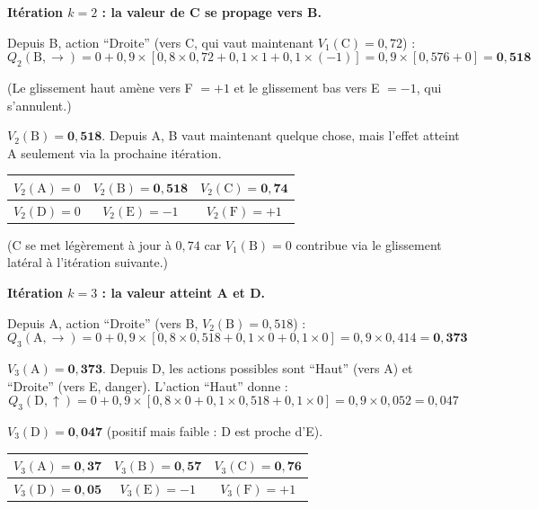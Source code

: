 \documentclass[11pt,a4paper]{article}
\begin{document}
\bigskip
\textbf{Itération $k=2$ : la valeur de C se propage vers B.}

Depuis B, action ``Droite'' (vers C, qui vaut maintenant $V_1(\text{C})=0{,}72$) :
$$Q_2(\text{B}, \rightarrow) = 0 + 0{,}9 \times [0{,}8 \times 0{,}72 + 0{,}1 \times 1 + 0{,}1 \times(-1)] = 0{,}9 \times [0{,}576 + 0] = \mathbf{0{,}518}$$

(Le glissement haut amène vers F $=+1$ et le glissement bas vers E $=-1$, qui s'annulent.)

$V_2(\text{B}) = \mathbf{0{,}518}$. Depuis A, B vaut maintenant quelque chose, mais l'effet atteint A seulement via la prochaine itération.

\begin{center}
\begin{tabular}{|c|c|c|}
\hline
$V_2(\text{A})=0$ & $V_2(\text{B})=\mathbf{0{,}518}$ & $V_2(\text{C})=\mathbf{0{,}74}$ \\
\hline
$V_2(\text{D})=0$ & $V_2(\text{E})=-1$ & $V_2(\text{F})=+1$ \\
\hline
\end{tabular}
\end{center}

(C se met légèrement à jour à $0{,}74$ car $V_1(\text{B})=0$ contribue via le glissement latéral à l'itération suivante.)

\bigskip
\textbf{Itération $k=3$ : la valeur atteint A et D.}

Depuis A, action ``Droite'' (vers B, $V_2(\text{B})=0{,}518$) :
$$Q_3(\text{A}, \rightarrow) = 0 + 0{,}9 \times [0{,}8 \times 0{,}518 + 0{,}1 \times 0 + 0{,}1 \times 0] = 0{,}9 \times 0{,}414 = \mathbf{0{,}373}$$

$V_3(\text{A}) = \mathbf{0{,}373}$. Depuis D, les actions possibles sont ``Haut'' (vers A) et ``Droite'' (vers E, danger). L'action ``Haut'' donne :
$$Q_3(\text{D}, \uparrow) = 0 + 0{,}9 \times [0{,}8 \times 0 + 0{,}1 \times 0{,}518 + 0{,}1 \times 0] = 0{,}9 \times 0{,}052 = 0{,}047$$

$V_3(\text{D}) = \mathbf{0{,}047}$ (positif mais faible : D est proche d'E).

\begin{center}
\begin{tabular}{|c|c|c|}
\hline
$V_3(\text{A})=\mathbf{0{,}37}$ & $V_3(\text{B})=\mathbf{0{,}57}$ & $V_3(\text{C})=\mathbf{0{,}76}$ \\
\hline
$V_3(\text{D})=\mathbf{0{,}05}$ & $V_3(\text{E})=-1$ & $V_3(\text{F})=+1$ \\
\hline
\end{tabular}
\end{center}
\end{document}
